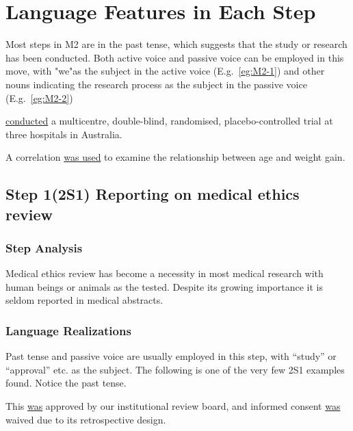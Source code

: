 \documentclass[a4paper]{ctexbook}
\begin{document}
\section{Language Features in Each Step}

Most steps in M2 are in the past tense, which suggests that the study or research has been conducted. Both active voice and passive voice can be employed in this move, with "we"as the subject in the active voice (E.g.~\ref{eg:M2-1}) and other nouns indicating the research process as the subject in the passive voice (E.g.~\ref{eg:M2-2})

\begin{eg}[label={eg:M2-1}]{}
   \uline{conducted} a multicentre, double-blind, randomised, placebo-controlled trial at three hospitals in Australia.
\end{eg}

\begin{eg}[label={eg:M2-2}]{}
  A correlation  \uline{was used} to examine the relationship between age and weight gain.
\end{eg}

  \subsection{Step 1(2S1) Reporting on medical ethics review}

    \subsubsection{Step Analysis}

    Medical ethics review has become a necessity in most medical research with human beings or animals as the tested. Despite its growing importance it is seldom reported in medical abstracts.

    \subsubsection{Language Realizations}

    Past tense and passive voice are usually employed in this step, with ``study'' or ``approval'' etc. as the subject. The following is one of the very few 2S1 examples found. Notice the past tense.
    
    \begin{eg}
      This  \uline{was} approved by our institutional review board, and informed consent \uline{was} waived due to its retrospective design.
    \end{eg}
\end{document}
